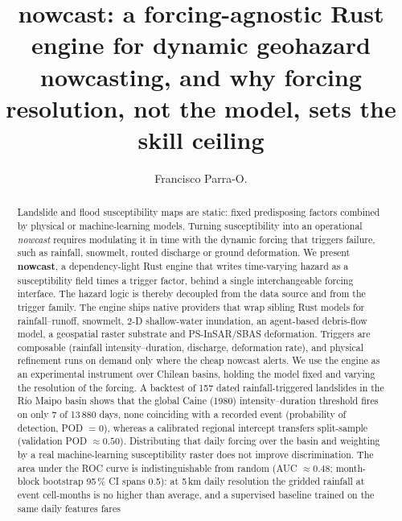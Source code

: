 \documentclass[authoryear,preprint,review,12pt]{elsarticle}
\begin{document}
\begin{frontmatter}

\title{nowcast: a forcing-agnostic Rust engine for dynamic geohazard
nowcasting, and why forcing resolution, not the model, sets the skill ceiling}

\author[1]{Francisco Parra-O.}


\begin{abstract}
Landslide and flood susceptibility maps are static: fixed predisposing factors
combined by physical or machine-learning models. Turning susceptibility into an
operational \emph{nowcast} requires modulating it in time with the dynamic
forcing that triggers failure, such as rainfall, snowmelt, routed discharge or
ground deformation. We present \textbf{nowcast}, a dependency-light Rust engine
that writes time-varying hazard as a susceptibility field times a trigger factor,
behind a single interchangeable forcing interface. The hazard logic is thereby
decoupled from the data source and from the trigger family. The engine ships
native providers that wrap sibling Rust models for rainfall--runoff, snowmelt,
2-D shallow-water inundation, an agent-based debris-flow model, a geospatial
raster substrate and PS-InSAR/SBAS deformation. Triggers are composable (rainfall
intensity--duration, discharge, deformation rate), and physical refinement runs
on demand only where the cheap nowcast alerts. We use the engine as an
experimental instrument over Chilean basins, holding the model fixed and varying
the resolution of the forcing. A backtest of 157 dated rainfall-triggered
landslides in the R\'io Maipo basin shows that the global Caine (1980)
intensity--duration threshold fires on only 7 of 13\,880 days, none coinciding with a
recorded event (probability of
detection, POD $=0$), whereas a calibrated regional intercept transfers
split-sample (validation POD $\approx 0.50$). Distributing that daily forcing
over the basin and weighting by a real machine-learning susceptibility raster
does not improve discrimination. The area under the ROC curve is indistinguishable
from random (AUC $\approx 0.48$; month-block bootstrap 95\,\% CI spans 0.5): at
5\,km daily resolution the gridded rainfall at event cell-months is no higher
than average, and a supervised baseline trained on the same daily features fares

\end{abstract}
\end{frontmatter}
\end{document}
